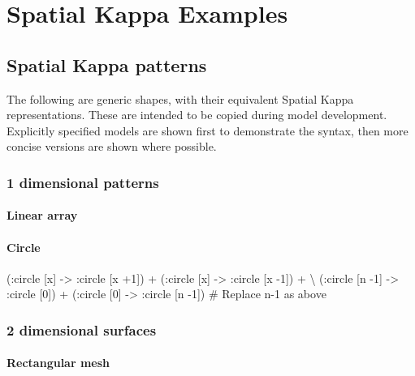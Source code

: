 \chapter{Spatial Kappa Examples}
\label{chap:resources}

\section{Spatial Kappa patterns}
\label{sec:spatialPatterns}

The following are generic shapes, with their equivalent Spatial Kappa representations. These are intended to be copied during model development. Explicitly specified models are shown first to demonstrate the syntax, then more concise versions are shown where possible.


\subsection{1 dimensional patterns}

\subsubsection{Linear array}

\begin{kappasource}
\end{kappasource}

\subsubsection{Circle}

\begin{kappasource}
    (:circle [x] -> :circle [x +1]) + (:circle [x] -> :circle [x -1]) + {\textbackslash}
    (:circle [n -1] -> :circle [0]) + (:circle [0] -> :circle [n -1]) # Replace n-1 as above
\end{kappasource}


\subsection{2 dimensional surfaces}

\subsubsection{Rectangular mesh}

